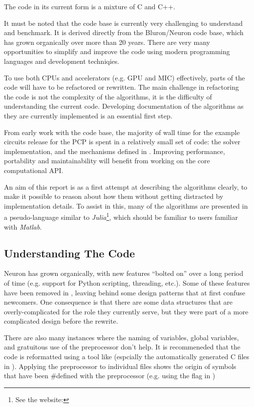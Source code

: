 The code in its current form is a mixture of C and C++.

It must be noted that the code base is currently very challenging to understand and benchmark. It is derived directly from the Bluron/Neuron code base, which has grown organically over more than 20 years. There are very many opportunities to simplify and improve the code using modern programming languages and development techniqies.

To use both CPUs and accelerators (e.g. GPU and MIC) effectively, parts of the code will have to be refactored or rewritten. The main challenge in refactoring the code is not the complexity of the algorithms, it is the difficulty of understanding the current code. Developing documentation of the algorithms as they are currently implemented is an essential first step.

From early work with the code base, the majority of wall time for the example circuits release for the PCP is spent in a relatively small set of code: the  solver implementation, and the mechanisms defined in . Improving performance, portability and maintainability will benefit from working on the core computational API.

An aim of this report is as a first attempt at describing the algorithms clearly, to make it possible to reason about how them without getting distracted by implementation details. To assist in this, many of the algorithms are presented in a pseudo-language similar to \emph{Julia}\footnote{See the website: }, which should be familiar to users familiar with \emph{Matlab}.

\subsection{Understanding The Code}
Neuron has grown organically, with new features ``bolted on'' over a long period of time (e.g. support for Python scripting, threading, etc.). Some of these features have been removed in \neuron, leaving behind some design patterns that at first confuse newcomers. One consequence is that there are some data structures that are overly-complicated for the role they currently serve, but they were part of a more complicated design before the \neuron rewrite.

There are also many instances where the naming of variables, global variables, and gratuitous use of the preprocessor don't help. It is recommeneded that the code is reformatted using a tool like  (espcially the automatically generated C files in ). Applying the preprocessor to individual files shows the origin of symbols that have been \#defined with the preprocessor (e.g. using the  flag in )

